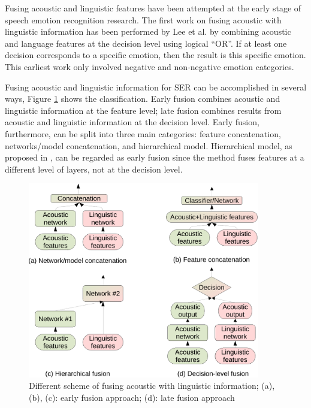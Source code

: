 Fusing acoustic and linguistic features have been attempted at the early stage
of speech emotion recognition research. The first work on fusing acoustic with
linguistic information has been performed by Lee et al. \cite{Lee2002} by
combining acoustic and language features at the decision level using logical
``OR''. If at least one decision corresponds to a specific emotion, then the
result is this specific emotion. This earliest work only involved negative and
non-negative emotion categories.

Fusing acoustic and linguistic information for SER can be accomplished in
several ways, Figure \ref{fig:ser_bimodal} shows the classification. Early
fusion combines acoustic and linguistic information at the feature level; late
fusion combines results from acoustic and linguistic information at the
decision level.  Early fusion, furthermore, can be split into three main
categories: feature concatenation, networks/model concatenation, and
hierarchical model.  Hierarchical model, as proposed in
\cite{Majumder2018,Tian2019}, can be regarded as early fusion since the method
fuses features at a different level of layers, not at the decision level.

\begin{figure}[htbp]
    \centering
    \includegraphics[width=0.9\textwidth]{../fig/ser_bimodal-crop.pdf}
    \caption{Different scheme of fusing acoustic with linguistic information; (a), (b), (c): early fusion approach; (d): late fusion approach}
    \label{fig:ser_bimodal}
\end{figure}

